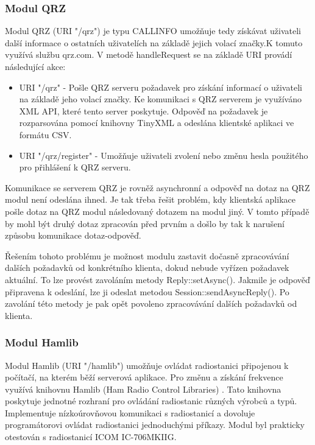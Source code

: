 \subsubsection{Modul QRZ}

Modul QRZ (URI "/qrz") je typu CALLINFO umožňuje tedy získávat uživateli další informace o ostatních uživatelích na základě jejich
volací značky.K tomuto využívá službu qrz.com. V metodě handleRequest se na základě URI provádí následující akce:

\begin{itemize}
\item URI "/qrz" - Pošle QRZ serveru požadavek pro získání informací o uživateli na základě jeho volací značky. Ke komunikaci 
s QRZ serverem je využíváno XML API, které tento server poskytuje. Odpověď na požadavek je rozparsována pomocí knihovny 
TinyXML a odeslána klientské aplikaci ve formátu CSV.
\item URI "/qrz/register" - Umožňuje uživateli zvolení nebo změnu hesla použitého pro přihlášení k QRZ serveru.
\end{itemize}

Komunikace se serverem QRZ je rovněž asynchronní a odpověď na dotaz na QRZ modul není odeslána ihned.
Je tak třeba řešit problém, kdy klientská aplikace pošle dotaz na QRZ modul
následovaný dotazem na modul jiný. V tomto případě by mohl být druhý dotaz zpracován před prvním a došlo by tak k narušení
způsobu komunikace dotaz-odpověď.

Řešením tohoto problému je možnost modulu zastavit dočasně zpracovávání dalších požadavků od konkrétního klienta, dokud 
nebude vyřízen požadavek aktuální. To lze provést zavoláním metody Reply::setAsync(). Jakmile je odpověď připravena
k odeslání, lze ji odeslat metodou Session::sendAsyncReply(). Po zavolání této metody je pak opět povoleno zpracovávání
dalších požadavků od klienta.

\subsubsection{Modul Hamlib}

Modul Hamlib (URI "/hamlib") umožňuje ovládat radiostanici připojenou k
počítačí, na kterém běží serverová aplikace.
Pro změnu a získání frekvence využívá knihovnu Hamlib (Ham Radio Control Libraries) \cite{hamlib}.
Tato knihovna poskytuje jednotné rozhraní pro ovládání radiostanic různých výrobců a typů.
Implementuje nízkoúrovňovou komunikaci s radiostanicí a dovoluje programátorovi ovládat 
radiostanici jednoduchými příkazy.
Modul byl prakticky otestován s radiostanicí ICOM IC-706MKIIG.

